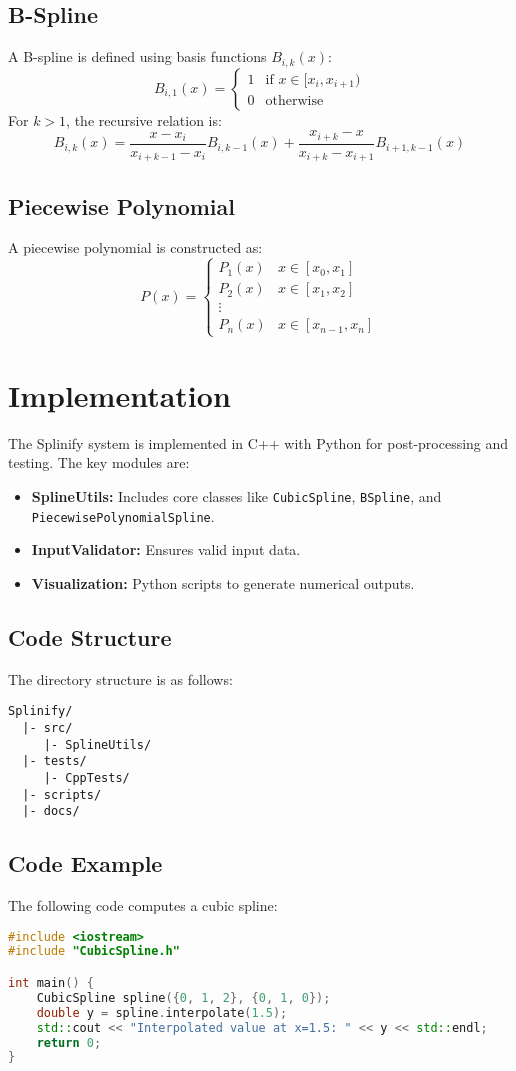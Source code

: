 \documentclass[10pt,a4paper]{article}
\begin{document}
\subsection{B-Spline}
A B-spline is defined using basis functions $B_{i,k}(x)$:
\[
B_{i,1}(x) = 
\begin{cases} 
1 & \text{if } x \in [x_i, x_{i+1}) \\
0 & \text{otherwise}
\end{cases}
\]
For $k > 1$, the recursive relation is:
\[
B_{i,k}(x) = \frac{x - x_i}{x_{i+k-1} - x_i}B_{i,k-1}(x) + \frac{x_{i+k} - x}{x_{i+k} - x_{i+1}}B_{i+1,k-1}(x)
\]

\subsection{Piecewise Polynomial}
A piecewise polynomial is constructed as:
\[
P(x) = \begin{cases}
P_1(x) & x \in [x_0, x_1] \\
P_2(x) & x \in [x_1, x_2] \\
\vdots \\
P_n(x) & x \in [x_{n-1}, x_n]
\end{cases}
\]

\section{Implementation}
The Splinify system is implemented in C++ with Python for post-processing and testing. The key modules are:
\begin{itemize}
    \item \textbf{SplineUtils:} Includes core classes like \texttt{CubicSpline}, \texttt{BSpline}, and \texttt{PiecewisePolynomialSpline}.
    \item \textbf{InputValidator:} Ensures valid input data.
    \item \textbf{Visualization:} Python scripts to generate numerical outputs.
\end{itemize}

\subsection{Code Structure}
The directory structure is as follows:
\begin{verbatim}
Splinify/
  |- src/
     |- SplineUtils/
  |- tests/
     |- CppTests/
  |- scripts/
  |- docs/
\end{verbatim}

\subsection{Code Example}
The following code computes a cubic spline:
\begin{lstlisting}[language=C++]
#include <iostream>
#include "CubicSpline.h"

int main() {
    CubicSpline spline({0, 1, 2}, {0, 1, 0});
    double y = spline.interpolate(1.5);
    std::cout << "Interpolated value at x=1.5: " << y << std::endl;
    return 0;
}
\end{lstlisting}
\end{document}
